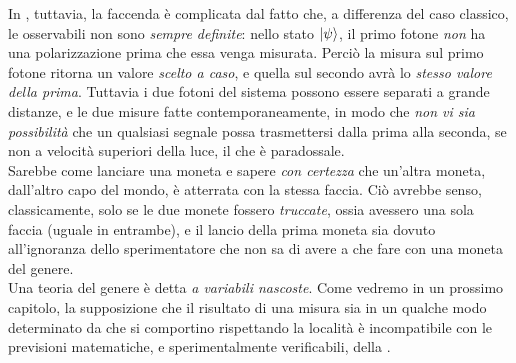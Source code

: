 \documentclass[../../FisicaTeorica.tex]{subfiles}
\begin{document}
\begin{oss}
In \MQ, tuttavia, la faccenda è complicata dal fatto che, a differenza del caso classico, le osservabili non sono \textit{sempre definite}: nello stato $\Ket{\psi}$, il primo fotone \textit{non} ha una polarizzazione  prima che essa venga misurata. Perciò la misura sul primo fotone ritorna un valore \textit{scelto a caso}, e quella sul secondo avrà lo \textit{stesso valore della prima}. Tuttavia i due fotoni del sistema possono essere separati a grande distanze, e le due misure fatte contemporaneamente, in modo che \textit{non vi sia possibilità} che un qualsiasi segnale possa trasmettersi dalla prima alla seconda, se non a velocità superiori della luce, il che è paradossale.\\
Sarebbe come lanciare una moneta e sapere \textit{con certezza} che un'altra moneta, dall'altro capo del mondo, è atterrata con la stessa faccia. Ciò avrebbe senso, classicamente, solo se le due monete fossero \textit{truccate}, ossia avessero una sola faccia (uguale in entrambe), e il lancio della prima moneta sia dovuto all'ignoranza dello sperimentatore che non sa di avere a che fare con una moneta del genere.\\
Una teoria del genere è detta \textit{a variabili nascoste}. Come vedremo in un prossimo capitolo, la supposizione che il risultato di una misura sia in un qualche modo determinato da  che si comportino rispettando la località è incompatibile con le previsioni matematiche, e sperimentalmente verificabili, della \MQ.
\end{oss}
\end{document}
